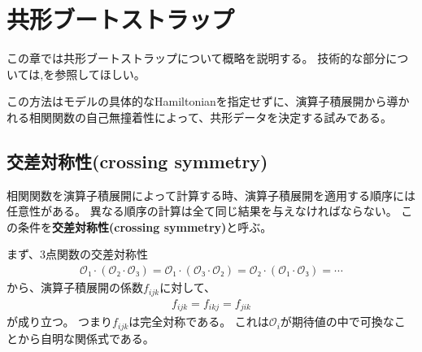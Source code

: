 \documentclass[\main/main.tex]{subfiles}
\begin{document}
\section{
    共形ブートストラップ
}
この章では共形ブートストラップについて概略を説明する。
技術的な部分については\cite{simmonsduffin2016tasi},\cite{Nakayama_2019}を参照してほしい。

この方法はモデルの具体的なHamiltonianを指定せずに、演算子積展開から導かれる相関関数の自己無撞着性によって、共形データを決定する試みである。

\subsection{
    交差対称性(crossing symmetry)
}
相関関数を演算子積展開によって計算する時、演算子積展開を適用する順序には任意性がある。
異なる順序の計算は全て同じ結果を与えなければならない。
この条件を\textbf{交差対称性(crossing symmetry)}と呼ぶ。

まず、3点関数の交差対称性
\begin{align}
    𝒪₁⋅(𝒪₂⋅𝒪₃) = 𝒪₁⋅(𝒪₃⋅𝒪₂) = 𝒪₂⋅(𝒪₁⋅𝒪₃) = ⋯
\end{align}
から、演算子積展開の係数$f_{ijk}$に対して、
\begin{align}
    f_{ijk} = f_{ikj} = f_{jik}
\end{align}
が成り立つ。
つまり$f_{ijk}$は完全対称である。
これは$𝒪_i$が期待値の中で可換なことから自明な関係式である。
\end{document}
